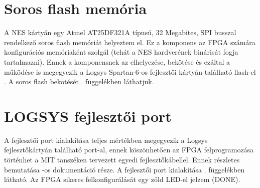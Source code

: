 \section{Soros flash memória}
	
	A NES kártyán egy Atmel AT25DF321A típusú, 32 Megabites, SPI busszal rendelkező soros flash memóriát helyeztem el. Ez a komponens az FPGA számára konfigurációs memóriaként szolgál (tehát a NES hardverének binárisát fogja tartalmazni). Ennek a komponensnek az elhelyezése, bekötése és ezáltal a működése is megegyezik a Logsys Spartan-6-os fejlesztői kártyán található flash-el \cite{spatan6}. A soros flash bekötését . függelékben láthatjuk.
	
\section{LOGSYS fejlesztői port}
\label{sec:logsysport}
	
	A fejlesztői port kialakítása teljes mértékben megegyezik a Logsys fejlesztőkártyán található port-al, ennek köszönhetően az FPGA felprogramozása történhet a MIT tanszéken tervezett egyedi fejlesztőkábellel. Ennek részletes bemutatása -os dokumentáció része. A fejlesztői port kialakítása . függelékben látható. Az FPGA sikeres felkonfigurálását egy zöld LED-el jelzem (DONE). %
	
